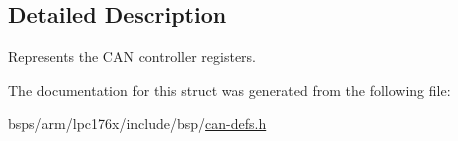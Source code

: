 \subsection{Detailed Description}
Represents the C\+AN controller registers. 

The documentation for this struct was generated from the following file\+:\begin{DoxyCompactItemize}
\item 
bsps/arm/lpc176x/include/bsp/\mbox{\hyperlink{can-defs_8h}{can-\/defs.\+h}}\end{DoxyCompactItemize}
